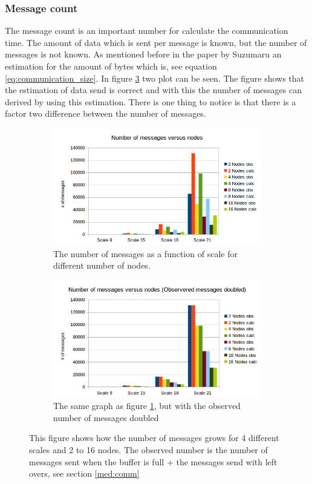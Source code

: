 \subsubsection{Message count}
The message count is an important number for calculate the communication time. The amount of data which is sent per message is known, but the number of messages is not known. As mentioned before in the paper by Suzumaru\cite{suzumura2011performance} an estimation for the amount of bytes which is, see equation \ref{eq:communication_size}. In figure \ref{fig:das_scale_messages} two plot can be seen. The figure shows that the estimation of data send is correct and with this the number of messages can derived by using this estimation. There is one thing to notice is that there is a factor two difference between the number of messages. 
\begin{figure}[!h]
\centering
\begin{subfigure}{.5\textwidth}
  \centering
  \includegraphics[width=\linewidth]{images/scale_vs_messages.png}
  \caption{The number of messages as a function of scale for different number of nodes.}
  \label{fig:scale_messages}
\end{subfigure}%
\begin{subfigure}{.5\textwidth}
  \centering
  \includegraphics[width=\linewidth]{images/scale_vs_messages_doubled.png}
  \caption{The same graph as figure \ref{fig:scale_messages}, but with the observed number of messages doubled}
  \label{fig:scale_messages_doubled}
\end{subfigure}
\caption{This figure shows how the number of messages grows for 4 different scales and 2 to 16 nodes. The observed number is the number of messages sent when the buffer is full + the messages send with left overs, see section \ref{med:comm}}
\label{fig:das_scale_messages}
\end{figure}
